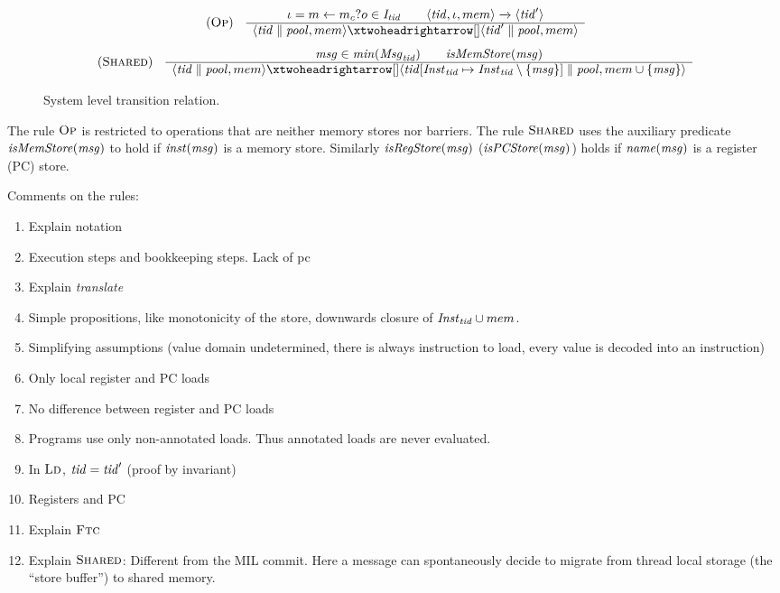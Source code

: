 
\begin{figure}
%
\[
\begin{array}{cc}
(\OpRule)
&
\begin{array}{c}
\inst = \ass{m_c}{m}{o}\in\Dec_\tid \qquad
\langle \tid,\inst,\mem\rangle \singlestep{}{} \langle\tid'\rangle \\ \hline
\langle \tid\parallel\thrdpool,\mem\rangle \doublestep{}{}
\langle \tid'\parallel \thrdpool,\mem\rangle
\end{array}
\end{array}
\]
%
\[
\begin{array}{cc}
(\ShareRule)
&
\begin{array}{c}
\msgvar \in \minMsg(\Msg_\tid) \qquad \isMemStore(\msgvar)  \\ \hline
\langle \tid\parallel\thrdpool,\mem\rangle \doublestep{}{}
\langle \tid[\Inst_\tid\mapsto\Inst_\tid\setminus\{\msgvar\}]\parallel\thrdpool,\mem\cup\{\msgvar\}\rangle
\end{array}
\end{array}
\]
\caption{System level transition relation.}
\label{fig:SystemTransitions}
\end{figure}
%
The rule $\textsc{Op}$ is restricted to operations that are neither memory stores nor barriers.
 The rule $\textsc{Shared}$ uses the auxiliary predicate $\mathit{isMemStore}(\mathit{msg})$ to hold if $\mathit{inst}(\mathit{msg})$ is a memory store. Similarly
$\mathit{isRegStore}(\mathit{msg})$ ($\mathit{isPCStore}(\mathit{msg})$) holds if $\mathit{name}(\mathit{msg})$ is a register (PC) store.

Comments on the rules:
%
\begin{enumerate}
\item Explain notation
\item Execution steps and bookkeeping steps. Lack of pc
\item Explain \emph{translate}
\item Simple propositions, like monotonicity of the store, downwards closure of $\mathit{Inst}_{\mathit{tid}}\cup mem$.
\item Simplifying assumptions (value domain undetermined, there is always instruction to load, every value is decoded into an instruction)
\item Only local register and PC loads
\item No difference between register and PC loads
\item Programs use only non-annotated loads. Thus annotated loads are never evaluated.
\item In $\textsc{Ld}$, $\mathit{tid}=\mathit{tid}'$ (proof by invariant)
\item Registers and PC
\item Explain $\textsc{Ftc}$
\item Explain $\textsc{Shared}$: Different from the MIL commit. Here a message
can spontaneously decide to migrate from thread local storage (the ``store buffer'') to shared memory.
\end{enumerate}

